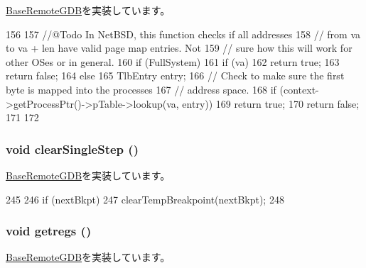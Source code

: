 \hyperlink{classBaseRemoteGDB_ac0968a34e271b194ce3e808a2252d6a3}{BaseRemoteGDB}を実装しています。


\begin{DoxyCode}
156 {
157     //@Todo In NetBSD, this function checks if all addresses
158     // from va to va + len have valid page map entries. Not
159     // sure how this will work for other OSes or in general.
160     if (FullSystem) {
161         if (va)
162             return true;
163         return false;
164     } else {
165         TlbEntry entry;
166         // Check to make sure the first byte is mapped into the processes
167         // address space.
168         if (context->getProcessPtr()->pTable->lookup(va, entry))
169             return true;
170         return false;
171     }
172 }
\end{DoxyCode}
\hypertarget{classSparcISA_1_1RemoteGDB_afd89268069d9026378b06b08c97f65f8}{
\subsubsection[{clearSingleStep}]{\setlength{\rightskip}{0pt plus 5cm}void clearSingleStep ()}}
\label{classSparcISA_1_1RemoteGDB_afd89268069d9026378b06b08c97f65f8}


\hyperlink{classBaseRemoteGDB_a69f1887d1310ab6f19cf5bbcdf9d7a1e}{BaseRemoteGDB}を実装しています。


\begin{DoxyCode}
245 {
246    if (nextBkpt)
247        clearTempBreakpoint(nextBkpt);
248 }
\end{DoxyCode}
\hypertarget{classSparcISA_1_1RemoteGDB_a62bc8adc5a48f1cbb5eb9bb64301d38d}{
\subsubsection[{getregs}]{\setlength{\rightskip}{0pt plus 5cm}void getregs ()}}
\label{classSparcISA_1_1RemoteGDB_a62bc8adc5a48f1cbb5eb9bb64301d38d}


\hyperlink{classBaseRemoteGDB_aca04756a764f2ef2add9ee91be012659}{BaseRemoteGDB}を実装しています。


